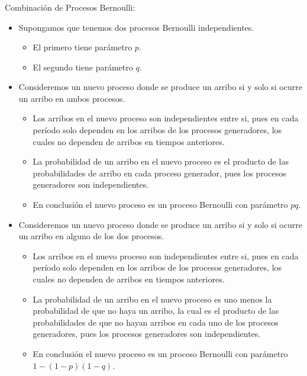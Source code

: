 \documentclass[ 10pt, xcolor = dvipsnames]{beamer}
\begin{document}
\begin{frame}[allowframebreaks]
\frametitle{\insertsection}

Combinaci\'on de Procesos Bernoulli: 
\begin{itemize}
\item Supongamos que tenemos dos procesos Bernoulli independientes. 
\begin{itemize}
\item El primero tiene par\'ametro $p$. 
\item El segundo tiene par\'ametro $q$. 
\end{itemize}
\item Consideremos un nuevo proceso donde se produce un arribo si y solo si \linebreak ocurre un arribo en ambos procesos. 
\begin{itemize}
\item Los arribos en el nuevo proceso son independientes entre si, pues en cada per\'iodo solo dependen en los arribos de los procesos generadores, los cuales no dependen de arribos en tiempos anteriores. 
\item La probabilidad de un arribo en el nuevo proceso es el producto de las probabilidades de arribo en cada proceso generador, pues los procesos generadores son independientes. 
\item En conclusi\'on el nuevo proceso es un proceso Bernoulli con par\'ametro $pq$. 
\end{itemize}
\framebreak
\item Consideremos un nuevo proceso donde se produce un arribo si y solo si \linebreak ocurre un arribo en alguno de los dos procesos. 
\begin{itemize}
\item Los arribos en el nuevo proceso son independientes entre si, pues en cada per\'iodo solo dependen en los arribos de los procesos generadores, los cuales no dependen de arribos en tiempos anteriores. 
\item La probabilidad de un arribo en el nuevo proceso es uno menos la probabilidad de que no haya un arribo, la cual es el producto de las probabilidades de que no hayan arribos en cada uno de los procesos generadores, pues los procesos generadores son independientes. 
\item En conclusi\'on el nuevo proceso es un proceso Bernoulli con par\'ametro $1 - (1-p)(1-q)$. 
\end{itemize}

\end{itemize}

\end{frame}
\end{document}
